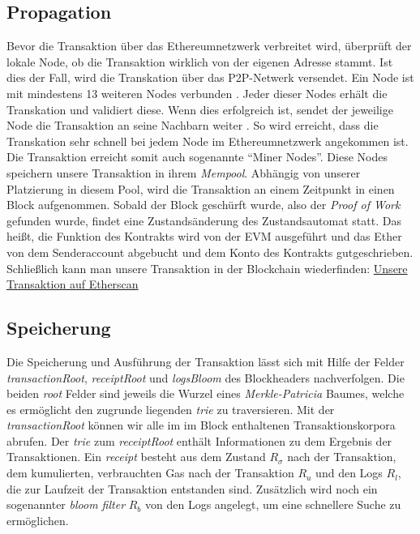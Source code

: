 \documentclass[runningheads]{llncs}
\begin{document}
\subsection{Propagation}
Bevor die Transaktion über das Ethereumnetzwerk verbreitet wird, überprüft der lokale Node, ob die Transaktion wirklich von der eigenen Adresse stammt. Ist dies der Fall, wird die Transkation über das P2P-Netwerk versendet. Ein Node ist mit mindestens 13 weiteren Nodes verbunden \cite[S. 123]{antonopoulos_mastering_2019}. Jeder dieser Nodes erhält die Transkation und validiert diese. Wenn dies erfolgreich ist, sendet der jeweilige Node die Transaktion an seine Nachbarn weiter \cite[S. 123]{antonopoulos_mastering_2019}. So wird erreicht, dass die Transkation sehr schnell bei jedem Node im Ethereumnetzwerk angekommen ist. Die Transaktion erreicht somit auch sogenannte "`Miner Nodes"'. Diese Nodes speichern unsere Transaktion in ihrem \textit{Mempool}. Abhängig von unserer Platzierung in diesem Pool, wird die Transaktion an einem Zeitpunkt in einen Block aufgenommen. Sobald der Block geschürft wurde, also der \textit{Proof of Work} gefunden wurde, findet eine Zustandsänderung des Zustandsautomat statt. Das heißt, die Funktion des Kontrakts wird von der EVM ausgeführt und das Ether von dem Senderaccount abgebucht und dem Konto des Kontrakts gutgeschrieben. Schließlich kann man unsere Transaktion in der Blockchain wiederfinden: \href{https://ropsten.etherscan.io/tx/0x6c5cd70f3464a6b68f95ba1bb7ebb5ece5a2f1ab4d45a5bb068e727e08fa827d}{Unsere Transaktion auf Etherscan}

\subsection{Speicherung}
Die Speicherung und Ausführung der Transaktion lässt sich mit Hilfe der Felder \textit{transactionRoot}, \textit{receiptRoot} und \textit{logsBloom} des Blockheaders nachverfolgen. Die beiden \textit{root} Felder sind jeweils die Wurzel eines \textit{Merkle-Patricia} Baumes, welche es ermöglicht den zugrunde liegenden \textit{trie} zu traversieren. \cite{noauthor_ethereum/patricia_nodate} Mit der \textit{transactionRoot} können wir alle  im im Block enthaltenen Transaktionskorpora abrufen. Der \textit{trie} zum \textit{receiptRoot} enthält Informationen zu dem Ergebnis der Transaktionen. Ein \textit{receipt} besteht aus dem Zustand $ R_{\sigma} $ nach der Transaktion, dem kumulierten, verbrauchten Gas nach der Transaktion $ R_u $ und den Logs $ R_l $, die zur Laufzeit der Transaktion entstanden sind. Zusätzlich wird noch ein sogenannter \textit{bloom filter} $ R_b $ von den Logs angelegt, um eine schnellere Suche zu ermöglichen. \cite{noauthor_logs_nodate}
\end{document}
